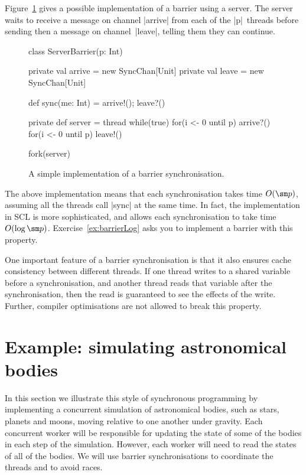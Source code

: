 

Figure~\ref{fig:serverBarrier} gives a possible implementation of a barrier
using a server.  The server waits to receive a message on channel |arrive|
from each of the |p|~threads before sending then a message on channel~|leave|,
telling them they can continue.

\begin{figure}[htb]
\begin{scala}
class ServerBarrier(p: Int){
  private val arrive = new SyncChan[Unit]
  private val leave = new SyncChan[Unit]

  def sync(me: Int) = { arrive!(); leave?() }

  private def server = thread{
    while(true){
      for(i <- 0 until p) arrive?()
      for(i <- 0 until p) leave!()
    }
  }

  fork(server)
}
\end{scala}
\caption{A simple implementation of a barrier synchronisation.}
\label{fig:serverBarrier}
\end{figure}

The above implementation means that each synchronisation takes time $O(\sm p)$,
assuming all the threads call |sync| at the same time.  In fact, the
implementation in SCL is more sophisticated, and allows each synchronisation
to take time $O(\log \sm p)$.  Exercise~\ref{ex:barrierLog} asks you to
implement a barrier with this property.

One important feature of a barrier synchronisation is that it also ensures
cache consistency between different threads.  If one thread writes to a shared
variable before a synchronisation, and another thread reads that variable
after the synchronisation, then the read is guaranteed to see the effects of
the write.  Further, compiler optimisations are not allowed to break this
property.  


\section{Example: simulating astronomical bodies}


In this section we illustrate this style of synchronous programming by
implementing a concurrent simulation of astronomical bodies, such as stars,
planets and moons, moving relative to one another under gravity.  Each
concurrent worker will be responsible for updating the state of some of the
bodies in each step of the simulation.  However, each worker will need to read
the states of all of the bodies.  We will use barrier synchronisations to
coordinate the threads and to avoid races.

